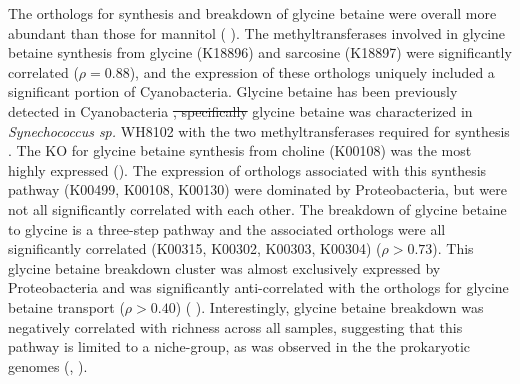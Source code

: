 \documentclass[utf8]{frontiersSCNS} %
\providecommand{\DIFaddtex}[1]{{\protect\color{blue}\uwave{#1}}} %
\providecommand{\DIFdeltex}[1]{{\protect\color{red}\sout{#1}}}                      %
\providecommand{\DIFaddbegin}{} %
\providecommand{\DIFaddend}{} %
\providecommand{\DIFdelbegin}{} %
\providecommand{\DIFdelend}{} %
\providecommand{\DIFadd}[1]{\texorpdfstring{\DIFaddtex{#1}}{#1}} %
\providecommand{\DIFdel}[1]{\texorpdfstring{\DIFdeltex{#1}}{}} %
\begin{document}
\DIFdelend The orthologs for synthesis and breakdown of glycine betaine were overall more abundant than those for mannitol ( \DIFaddbegin \DIFadd{B}\DIFaddend ). The methyltransferases involved in glycine betaine synthesis from glycine (K18896) and sarcosine (K18897) were significantly correlated ($\rho=0.88$), and the expression of these orthologs uniquely included a significant portion of Cyanobacteria. Glycine betaine has been previously detected in Cyanobacteria \citep{Fiore2015,Heal2020.12.22.424086}\DIFdelbegin \DIFdel{, specifically }\DIFdelend \DIFaddbegin \DIFadd{. Specifically, }\DIFaddend glycine betaine was characterized in \emph{Synechococcus sp.} WH8102 with the two methyltransferases required for synthesis \citep{Lu2006}. The KO for glycine betaine synthesis from choline (K00108) was the most highly expressed (). The expression of orthologs associated with this synthesis pathway (K00499, K00108, K00130) were dominated by Proteobacteria, but were not all significantly correlated with each other. The breakdown of glycine betaine to glycine is a three-step pathway and the associated orthologs were all significantly correlated (K00315, K00302, K00303, K00304) ($\rho > 0.73$). This glycine betaine breakdown cluster was almost exclusively expressed by Proteobacteria and was significantly anti-correlated with the orthologs for glycine betaine transport ($\rho > 0.40$) ( \DIFaddbegin \DIFadd{A}\DIFaddend ). Interestingly, glycine betaine breakdown was negatively correlated with richness across all samples, suggesting that this pathway is limited to a niche-group, as was observed in the the prokaryotic genomes (, ).
\end{document}
